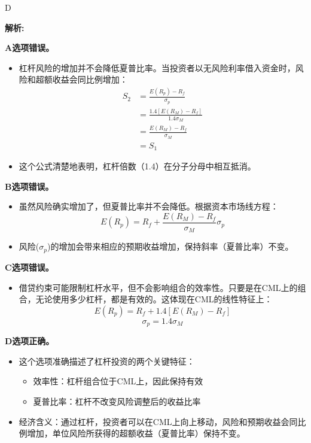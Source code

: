 \documentclass{article}
\newenvironment{explanation}
{\textbf{解析:}\par}
{\par}
\begin{document}
\begin{correctanswer}
    D
\end{correctanswer}

\begin{explanation}
    \textbf{A选项错误。}
    \begin{itemize}
        \item 杠杆风险的增加并不会降低夏普比率。当投资者以无风险利率借入资金时，风险和超额收益会同比例增加：
        \begin{align*}
            S_2 &= \frac{E(R_p) - R_f}{\sigma_p} \\
            &= \frac{1.4[E(R_M) - R_f]}{1.4\sigma_M} \\
            &= \frac{E(R_M) - R_f}{\sigma_M} \\
            &= S_1
        \end{align*}
        \item 这个公式清楚地表明，杠杆倍数（1.4）在分子分母中相互抵消。
    \end{itemize}

    \textbf{B选项错误。}
    \begin{itemize}
        \item 虽然风险确实增加了，但夏普比率并不会降低。根据资本市场线方程：
        \[
        E(R_p) = R_f + \frac{E(R_M) - R_f}{\sigma_M} \sigma_p
        \]
        \item 风险($\sigma_p$)的增加会带来相应的预期收益增加，保持斜率（夏普比率）不变。
    \end{itemize}

    \textbf{C选项错误。}
    \begin{itemize}
        \item 借贷约束可能限制杠杆水平，但不会影响组合的效率性。只要是在CML上的组合，无论使用多少杠杆，都是有效的。这体现在CML的线性特征上：
        \[
        E(R_p) = R_f + 1.4[E(R_M) - R_f]
        \]
        \[
        \sigma_p = 1.4\sigma_M
        \]
    \end{itemize}

    \textbf{D选项正确。}
\begin{itemize}
    \item 这个选项准确描述了杠杆投资的两个关键特征：
        \begin{itemize}
            \item 效率性：杠杆组合位于CML上，因此保持有效
            \item 夏普比率：杠杆不改变风险调整后的收益比率
        \end{itemize}
    \item 经济含义：通过杠杆，投资者可以在CML上向上移动，风险和预期收益会同比例增加，单位风险所获得的超额收益（夏普比率）保持不变。
\end{itemize}
\end{explanation}
\end{document}
